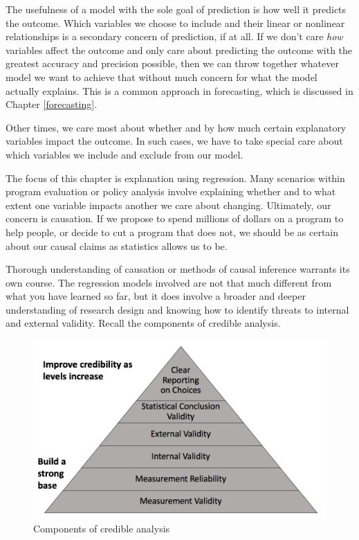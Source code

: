 \documentclass[
]{book}
\begin{document}
The usefulness of a model with the sole goal of prediction is how well it predicts the outcome. Which variables we choose to include and their linear or nonlinear relationships is a secondary concern of prediction, if at all. If we don't care \emph{how} variables affect the outcome and only care about predicting the outcome with the greatest accuracy and precision possible, then we can throw together whatever model we want to achieve that without much concern for what the model actually explains. This is a common approach in forecasting, which is discussed in Chapter \ref{forecasting}.

Other times, we care most about whether and by how much certain explanatory variables impact the outcome. In such cases, we have to take special care about which variables we include and exclude from our model.

The focus of this chapter is explanation using regression. Many scenarios within program evaluation or policy analysis involve explaining whether and to what extent one variable impacts another we care about changing. Ultimately, our concern is causation. If we propose to spend millions of dollars on a program to help people, or decide to cut a program that does not, we should be as certain about our causal claims as statistics allows us to be.

Thorough understanding of causation or methods of causal inference warrants its own course. The regression models involved are not that much different from what you have learned so far, but it does involve a broader and deeper understanding of research design and knowing how to identify threats to internal and external validity. Recall the components of credible analysis.

\begin{figure}

{\centering \includegraphics[width=\textwidth]{images/credible} 

}

\caption{Components of credible analysis}\label{fig:credfigrepeat}
\end{figure}
\end{document}
